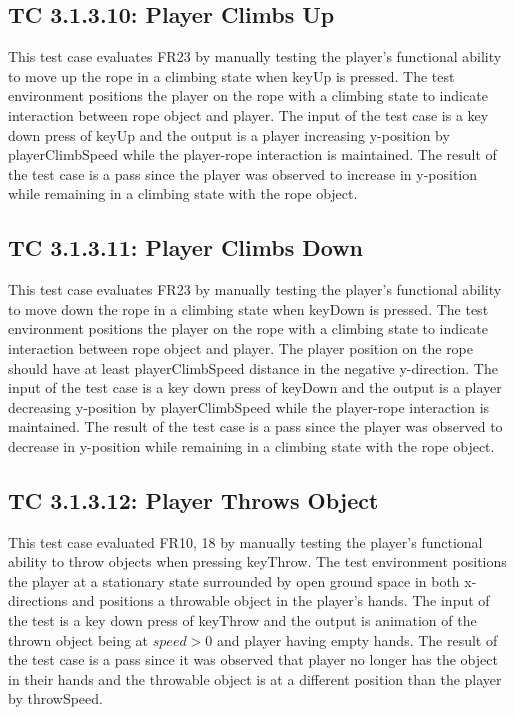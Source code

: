 \documentclass[12pt, titlepage]{article}
\begin{document}
\subsection*{TC 3.1.3.10: Player Climbs Up}
This test case evaluates FR23 by manually testing the player's functional ability to move up the rope in a climbing state when keyUp is pressed. The test environment positions the player on the rope with a climbing state to indicate interaction between rope object and player. The input of the test case is a key down press of keyUp and the output is a player increasing y-position by playerClimbSpeed while the player-rope interaction is maintained. The result of the test case is a pass since the player was observed to increase in y-position while remaining in a climbing state with the rope object. 

\subsection*{TC 3.1.3.11: Player Climbs Down}
This test case evaluates FR23 by manually testing the player's functional ability to move down the rope in a climbing state when keyDown is pressed. The test environment positions the player on the rope with a climbing state to indicate interaction between rope object and player. The player position on the rope should have at least playerClimbSpeed distance in the negative y-direction. The input of the test case is a key down press of keyDown and the output is a player decreasing y-position by playerClimbSpeed while the player-rope interaction is maintained. The result of the test case is a pass since the player was observed to decrease in y-position while remaining in a climbing state with the rope object.

\subsection*{TC 3.1.3.12: Player Throws Object}
This test case evaluated FR10, 18 by manually testing the player's functional ability to throw objects when pressing keyThrow. The test environment positions the player at a stationary state surrounded by open ground space in both x-directions and positions a throwable object in the player's hands. The input of the test is a key down press of keyThrow and the output is animation of the thrown object being at $speed>0$ and player having empty hands. The result of the test case is a pass since it was observed that player no longer has the object in their hands and the throwable object is at a different position than the player by throwSpeed. 
\end{document}
